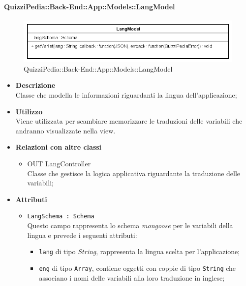 \paragraph{QuizziPedia::Back-End::App::Models::LangModel}
\label{QuizziPedia::Back-End::App::Models::LangModel}
\begin{figure}
	\centering
	\includegraphics[scale=0.45]{UML/Classi/Back-End/QuizziPedia_Back-End_App_Models_langModel.png}
	\caption{QuizziPedia::Back-End::App::Models::LangModel}
\end{figure}
	\begin{itemize}
		\item \textbf{Descrizione} \\
		Classe che modella le informazioni riguardanti la lingua dell'applicazione;
		\item \textbf{Utilizzo} \\
		Viene utilizzata per scambiare memorizzare le traduzioni delle variabili che andranno visualizzate nella view.
		\item \textbf{Relazioni con altre classi} \\
			\begin{itemize}
				\item OUT LangController \\
				Classe che gestisce la logica applicativa riguardante la traduzione delle variabili;
			\end{itemize}
		\item \textbf{Attributi} \\
			\begin{itemize}
				\item \texttt{LangSchema : Schema} \\
				Questo campo rappresenta lo schema \textit{mongoose} per le variabili della lingua e prevede i seguenti attributi:
					\begin{itemize}
						\item \texttt{lang} di tipo \textit{String}, rappresenta la lingua scelta per l'applicazione;
						\item \texttt{eng} di tipo \texttt{Array}, contiene oggetti con coppie di tipo \texttt{String} che associano i nomi delle variabili alla loro traduzione in inglese;

\end{itemize}
\end{itemize}
\end{itemize}
